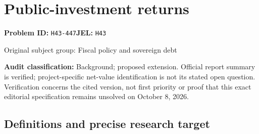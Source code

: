 \documentclass[11pt,a4paper]{article}
\begin{document}
\section*{Public-investment returns}
\textbf{Problem ID:} \texttt{H43-447}\quad \textbf{JEL:} \texttt{H43}\par
\label{problem:OP-0252}
\label{audited:ECON-097}
{\sffamily\small\color{muted}Original subject group: Fiscal policy and sovereign debt\par}
\label{definitions:problem:30007533}
\textbf{Audit classification:} Background; proposed extension. Official report summary is verified; project-specific net-value identification is not its stated open question. Verification concerns the cited version, not first priority or proof that this exact editorial specification remains unsolved on October 8, 2026.
\subsection*{Definitions and precise research target}
\end{document}
